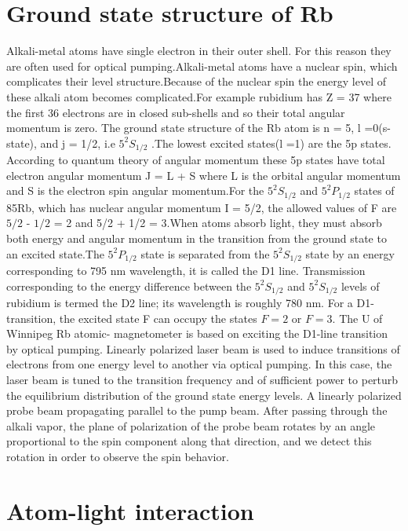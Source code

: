 \section{Ground state structure of Rb }
\label{S:2} 
Alkali-metal atoms have single electron in their outer shell. For this reason they are often used for optical pumping.Alkali-metal atoms have a nuclear spin,
which complicates their level structure.Because of the nuclear spin the energy level of these alkali atom becomes complicated.For example rubidium has Z = 37 where the first 36 electrons are in closed sub-shells and so their total angular momentum is zero. 
The ground state structure of the Rb atom is n = 5, l =0(s-state), and j = 1/2, i.e $5^2S_{1/2}$ .The lowest excited states(l =1) are the
 5p states. According to quantum theory of angular momentum
these 5p states have total electron angular momentum J = L + S where L is
the orbital angular momentum and S is the electron spin angular momentum.For the $5^2S_{1/2}$ and $5^2P_{1/2}$ states of 85Rb, which has nuclear angular momentum I = 5/2, the allowed values of F are $5/2$ - $1/2$ = 2 and 5/2 + 1/2 = 3.When atoms absorb light, they must absorb both energy and angular
momentum in the transition from the ground state to an excited state.The $5^2P_{1/2}$
state is separated from the $5^2S_{1/2}$ state by an energy corresponding to 795 nm wavelength, it is called the
D1 line. Transmission corresponding to the energy difference between the $5^2S_{1/2}$ and $5^2S_{1/2}$ levels of rubidium is termed the D2 line; its wavelength is roughly 780 nm\cite{doe:website}. For a D1-transition, the excited state F can occupy the states $F = 2$ or $F = 3$.
The U of Winnipeg Rb atomic- magnetometer is based on exciting the D1-line transition by optical pumping.  Linearly polarized laser beam is used to induce transitions of electrons from one energy level to another via optical pumping. In this case, the laser beam is tuned to the transition frequency and of sufficient power to perturb the equilibrium distribution of the ground state energy levels\cite{}. A linearly polarized probe beam propagating parallel to the
pump beam. After passing through the alkali vapor, the plane of polarization of the probe beam
rotates by an angle proportional to the spin component along that direction, and we detect
this rotation in order to observe the spin behavior.



\section{Atom-light interaction} 

